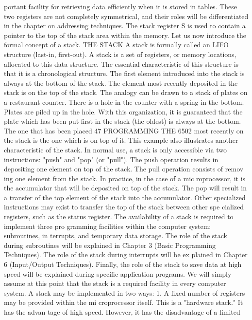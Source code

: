 portant facility for retrieving data efficiently when it is stored in
tables. These two registers are not completely symmetrical, and
their roles will be differentiated in the chapter on addressing
techniques.
The stack register S is used to contain a pointer to the top of the
stack area within the memory.
Let us now introduce the formal concept of a stack.
THE STACK
A stack is formally called an LIFO structure (last-in, first-out). A
stack is a set of registers, or memory locations, allocated to this
data structure. The essential characteristic of this structure is
that it is a chronological structure. The first element introduced
into the stack is always at the bottom of the stack. The element
most recently deposited in the stack is on the top of the stack. The
analogy can be drawn to a stack of plates on a restaurant
counter. There is a hole in the counter with a spring in the bottom.
Plates are piled up in the hole. With this organization, it is
guaranteed that the plate which has been put first in the stack
(the oldest) is always at the bottom. The one that has been placed
47
PROGRAMMING THE 6502
most recently on the stack is the one which is on top of it. This
example also illustrates another characteristic of the stack. In
normal use, a stack is only accessible via two instructions: "push"
and "pop" (or "pull"). The push operation results in depositing one
element on top of the stack. The pull operation consists of remov
ing one element from the stack. In practice, in the case of a mic
roprocessor, it is the accumulator that will be deposited on top of
the stack. The pop will result in a transfer of the top element of
the stack into the accumulator. Other specialized instructions
may exist to transfer the top of the stack between other spe
cialized registers, such as the status register.
The availability of a stack is required to implement three pro
gramming facilities within the computer system: subroutines, in
terrupts, and temporary data storage. The role of the stack during
subroutines will be explained in Chapter 3 (Basic Programming
Techniques). The role of the stack during interrupts will be ex
plained in Chapter 6 (Input/Output Techniques). Finally, the role
of the stack to save data at high speed will be explained during
specific application programs.
We will simply assume at this point that the stack is a required
facility in every computer system. A stack may be implemented
in two ways:
1. A fixed number of registers may be provided within the mi
croprocessor itself. This is a "hardware stack." It has the advan
tage of high speed. However, it has the disadvantage of a limited
